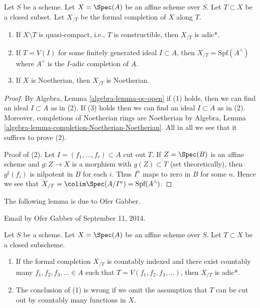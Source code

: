 \begin{lemma}
\label{lemma-affine-formal-completion-types}
Let $S$ be a scheme. Let $X = \Spec(A)$ be an affine scheme over $S$.
Let $T \subset X$ be a closed subset. Let $X_{/T}$ be the
formal completion of $X$ along $T$.
\begin{enumerate}
\item If $X \setminus T$ is quasi-compact, i.e., $T$ is constructible,
then $X_{/T}$ is adic*.
\item If $T = V(I)$ for some finitely generated ideal $I \subset A$,
then $X_{/T} = \text{Spf}(A^\wedge)$ where $A^\wedge$ is the
$I$-adic completion of $A$.
\item If $X$ is Noetherian, then $X_{/T}$ is Noetherian.
\end{enumerate}
\end{lemma}

\begin{proof}
By Algebra, Lemma \ref{algebra-lemma-qc-open} if (1) holds, then
we can find an ideal $I \subset A$ as in (2). If (3) holds then
we can find an ideal $I \subset A$ as in (2). Moreover, completions
of Noetherian rings are Noetherian by
Algebra, Lemma \ref{algebra-lemma-completion-Noetherian-Noetherian}.
All in all we see that it suffices to prove (2).

\medskip\noindent
Proof of (2).
Let $I = (f_1, \ldots, f_r) \subset A$ cut out $T$.
If $Z = \Spec(B)$ is an affine scheme and $g : Z \to X$ is
a morphism with $g(Z) \subset T$ (set theoretically), then
$g^\sharp(f_i)$ is nilpotent in $B$ for each $i$. Thus
$I^n$ maps to zero in $B$ for some $n$. Hence we see that
$X_{/T} = \colim \Spec(A/I^n) = \text{Spf}(A^\wedge)$.
\end{proof}

\noindent
The following lemma is due to Ofer Gabber.

\begin{lemma}
\label{lemma-completion-countably-indexed}
\begin{reference}
Email by Ofer Gabber of September 11, 2014.
\end{reference}
Let $S$ be a scheme. Let $X = \Spec(A)$ be an affine scheme over $S$.
Let $T \subset X$ be a closed subscheme.
\begin{enumerate}
\item If the formal completion $X_{/T}$ is countably indexed
and there exist countably many $f_1, f_2, f_3, \ldots \in A$ such that
$T = V(f_1, f_2, f_3, \ldots)$, then $X_{/T}$ is adic*.
\item The conclusion of (1) is wrong if we omit the assumption that
$T$ can be cut out by countably many functions in $X$.
\end{enumerate}
\end{lemma}

